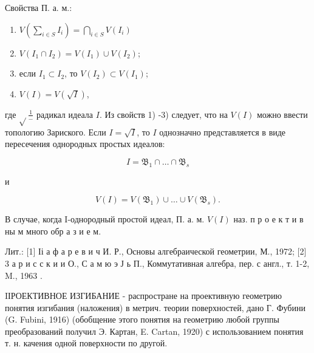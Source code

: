 \documentclass[10pt]{article}
\begin{document}
Свойства П. а. м.:



\begin{enumerate}

  \item $V\left(\sum_{i \in S} I_{i}\right)=\bigcap_{i \in S} V\left(I_{i}\right)$



  \item $V\left(I_{1} \cap I_{2}\right)=V\left(I_{1}\right) \cup V\left(I_{2}\right)$;



  \item если $I_{1} \subset I_{2}$, то $V\left(I_{2}\right) \subset V\left(I_{1}\right)$;



  \item $V(I)=V(\sqrt{I})$,



\end{enumerate}



где $\sqrt{ } \frac{1}{-}$ радикал идеала $I$. Из свойств 1) -3) следует, что на $V(I)$ можно ввести топологию Зариского. Если $I=\sqrt{I}$, то $I$ однозначно представляется в виде пересечения однородных простых идеалов:



\[

I=\mathfrak{B}_{1} \cap \ldots \cap \mathfrak{B}_{s}

\]



и



\[

V(I)=V\left(\mathfrak{B}_{1}\right) \cup \ldots \cup V\left(\mathfrak{B}_{s}\right) .

\]



В случае, когда I-однородный простой идеал, П. а. м. $V(I)$ наз. п р о е к т и в ны м много обр а з и е м.



Лит.: [1] Іі а ф а р е в и ч И. Р., Основы алгебраической геометрии, М., 1972; [2] 3 а р и с с к и и О., С а м ю э Ј ь П., Коммутативная алгебра, пер. с англ., т. 1-2, M., 1963 .



IІРОЕКТИВНОЕ ИЗГИБАНИЕ - распростране на проективную геометрию понятия изгибания (наложения) в метрич. теории поверхностей, дано Г. Фубини (G. Fubini, 1916) (обобщение этого понятия на геометрию любой группы преобразований получил Э. Картан, E. Cartan, 1920) с использованием понятия т. н. качения одной поверхности по другой.
\end{document}
